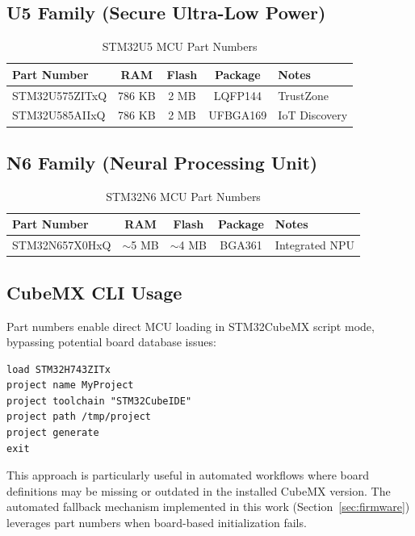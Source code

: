 \subsection{U5 Family (Secure Ultra-Low Power)}

\begin{table}[H]
    \centering
    \caption{STM32U5 MCU Part Numbers}
    \label{tab:u5_parts}
    \small
    \begin{tabular}{|l|c|c|c|l|}
        \hline
        \textbf{Part Number} & \textbf{RAM} & \textbf{Flash} & \textbf{Package} & \textbf{Notes} \\
        \hline
        STM32U575ZITxQ       & 786 KB       & 2 MB           & LQFP144          & TrustZone      \\
        STM32U585AIIxQ       & 786 KB       & 2 MB           & UFBGA169         & IoT Discovery  \\
        \hline
    \end{tabular}
\end{table}

\subsection{N6 Family (Neural Processing Unit)}

\begin{table}[H]
    \centering
    \caption{STM32N6 MCU Part Numbers}
    \label{tab:n6_parts}
    \small
    \begin{tabular}{|l|c|c|c|l|}
        \hline
        \textbf{Part Number} & \textbf{RAM} & \textbf{Flash} & \textbf{Package} & \textbf{Notes} \\
        \hline
        STM32N657X0HxQ       & $\sim$5 MB   & $\sim$4 MB     & BGA361           & Integrated NPU \\
        \hline
    \end{tabular}
\end{table}

\subsection{CubeMX CLI Usage}

Part numbers enable direct MCU loading in STM32CubeMX script mode, bypassing potential board database issues:

\begin{verbatim}
load STM32H743ZITx
project name MyProject
project toolchain "STM32CubeIDE"
project path /tmp/project
project generate
exit
\end{verbatim}

This approach is particularly useful in automated workflows where board definitions may be missing or outdated in the installed CubeMX version. The automated fallback mechanism implemented in this work (Section~\ref{sec:firmware}) leverages part numbers when board-based initialization fails.
